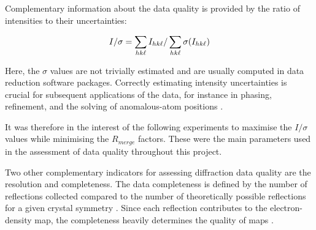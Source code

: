 Complementary information about the data quality is provided by the ratio of intensities to their uncertainties:

\begin{equation}
    I / \sigma = \sum_{hk\ell} I_{hk\ell}/\sum_{hk\ell} \sigma(I_{hk\ell})
\end{equation}

Here, the $\sigma$ values are not trivially estimated and are usually computed in data reduction software packages. Correctly estimating intensity uncertainties is crucial for subsequent applications of the data, for instance in phasing, refinement, and the solving of anomalous-atom positions \cite{Dauter1999}.  

It was therefore in the interest of the following experiments to maximise the $I / \sigma$ values while minimising the $R_{merge}$ factors. These were the main parameters used in the assessment of data quality throughout this project.

Two other complementary indicators for assessing diffraction data quality are the resolution and completeness. The data completeness is defined by the number of reflections collected compared to the number of theoretically possible reflections for a given crystal symmetry \cite{Arkhipova2017}. %
Since each reflection contributes to the electron-density map, the completeness heavily determines the quality of maps \cite{Wlodawer2007}.

